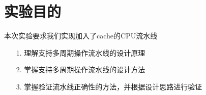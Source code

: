 \section{实验目的}
本次实验要求我们实现加入了cache的CPU流水线
\begin{itemize}
    \item [1.] 理解支持多周期操作流水线的设计原理
    \item [2.] 掌握支持多周期操作流水线的设计方法
    \item [3.] 掌握验证流水线正确性的方法，并根据设计思路进行验证
\end{itemize}    